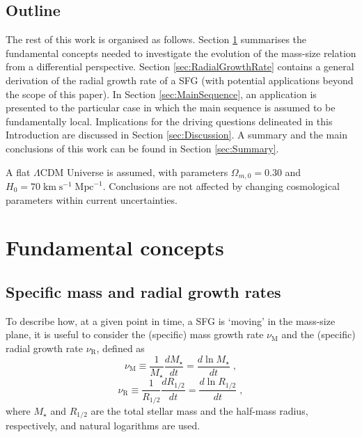\documentclass[fleqn,usenatbib]{mnras}
\begin{document}
\subsection{Outline}\label{subsec:outline}

The rest of this work is organised as follows. Section \ref{sec:FundamentalConcepts} summarises the fundamental concepts needed to investigate the evolution of the mass-size relation from a differential perspective. Section \ref{sec:RadialGrowthRate} contains a general derivation of the radial growth rate of a SFG (with potential applications beyond the scope of this paper). In Section \ref{sec:MainSequence}, an application is presented to the particular case in which the main sequence is assumed to be fundamentally local. Implications for the driving questions delineated in this Introduction are discussed in Section \ref{sec:Discussion}. A summary and the main conclusions of this work can be found in Section \ref{sec:Summary}.

A flat $\Lambda$CDM Universe is assumed, with parameters $\Omega_{m,0} = 0.30$ and $H_0 = 70 \; \textrm{km} \; \textrm{s}^{-1} \; \textrm{Mpc}^{-1}$. Conclusions are not affected by changing cosmological parameters within current uncertainties.





\section[Fundamental concepts]{Fundamental concepts}\label{sec:FundamentalConcepts}

\subsection{Specific mass and radial growth rates}\label{subsec:growthrates}
To describe how, at a given point in time, a SFG is `moving' in the mass-size plane, it is useful to consider the (specific) mass growth rate $\nu_\textrm{M}$ and the (specific) radial growth rate $\nu_\textrm{R}$, defined as
\begin{equation}\label{nuMdef}
\nu_\textrm{M} \equiv \frac{1}{M_\star} \frac{d M_\star}{dt} = \frac{d \ln M_\star}{dt} \; ,
\end{equation}
\begin{equation}\label{nuRdef}
\nu_\textrm{R} \equiv \frac{1}{R_{1/2}} \frac{d R_{1/2}}{dt} = \frac{d \ln R_{1/2}}{dt} \; ,
\end{equation}
where $M_\star$ and $R_{1/2}$ are the total stellar mass and the half-mass radius, respectively, and natural logarithms are used.
\end{document}
